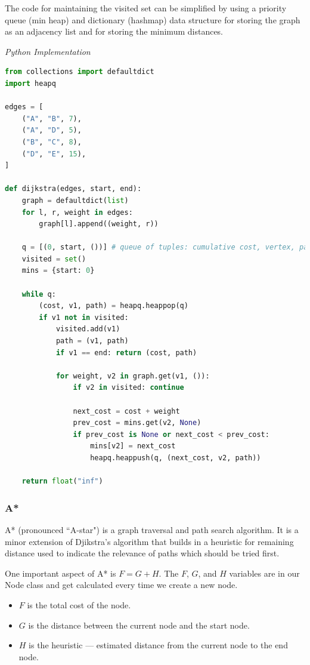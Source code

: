 \documentclass{article}
\begin{document}
    The code for maintaining the visited set can be simplified by using a priority queue (min heap) and dictionary (hashmap) data structure for storing the graph as an adjacency list and for storing the minimum distances.
    
\vspace{8pt} \emph{Python Implementation}
\begin{lstlisting}[language=Python]
from collections import defaultdict
import heapq 

edges = [
    ("A", "B", 7),
    ("A", "D", 5),
    ("B", "C", 8),
    ("D", "E", 15),
]

def dijkstra(edges, start, end):
    graph = defaultdict(list)
    for l, r, weight in edges:
        graph[l].append((weight, r))

    q = [(0, start, ())] # queue of tuples: cumulative cost, vertex, path
    visited = set()
    mins = {start: 0}
    
    while q:
        (cost, v1, path) = heapq.heappop(q)
        if v1 not in visited:
            visited.add(v1)
            path = (v1, path)
            if v1 == end: return (cost, path)

            for weight, v2 in graph.get(v1, ()):
                if v2 in visited: continue
                
                next_cost = cost + weight
                prev_cost = mins.get(v2, None)
                if prev_cost is None or next_cost < prev_cost:
                    mins[v2] = next_cost
                    heapq.heappush(q, (next_cost, v2, path))

    return float("inf")
\end{lstlisting}

    \subsubsection{A*}
    A* (pronounced ``A-star") is a graph traversal and path search algorithm. It is a minor extension of Djikstra's algorithm that builds in a heuristic for remaining distance used to indicate the relevance of paths which should be tried first.
    
    One important aspect of A* is $F = G + H$. The $F$, $G$, and $H$ variables are in our Node class and get calculated every time we create a new node. 
    \begin{itemize}
        \item $F$ is the total cost of the node.
        \item $G$ is the distance between the current node and the start node.
        \item $H$ is the heuristic — estimated distance from the current node to the end node.
    \end{itemize}
    
\end{document}

